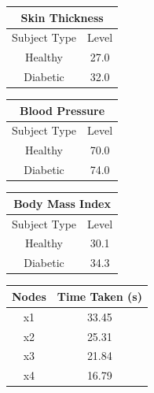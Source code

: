 \documentclass[12pt]{article}
\begin{document}
\begin{table}[]
\centering
\begin{tabular}{|c|c|}
\hline
\multicolumn{2}{|c|}{Skin Thickness} \\ \hline
Subject Type      & Level     \\ \hline
Healthy           & 27.0     \\ \hline
Diabetic          & 32.0     \\ \hline
\end{tabular}
\label{table:10}
\end{table}



\begin{table}[]
\centering
\begin{tabular}{|c|c|}
\hline
\multicolumn{2}{|c|}{Blood Pressure} \\ \hline
Subject Type      & Level     \\ \hline
Healthy           & 70.0    \\ \hline
Diabetic          & 74.0     \\ \hline
\end{tabular}
\label{table:11}
\end{table}


\begin{table}[]
\centering
\begin{tabular}{|c|c|}
\hline
\multicolumn{2}{|c|}{Body Mass Index} \\ \hline
Subject Type      & Level     \\ \hline
Healthy           & 30.1      \\ \hline
Diabetic          & 34.3      \\ \hline
\end{tabular}
\label{table:12}
\end{table}

\begin{table}[]
\centering
\begin{tabular}{|c|c|}
\hline
Nodes & Time Taken (s) \\\hline
x1    & 33.45          \\\hline
x2    & 25.31          \\\hline
x3    & 21.84          \\\hline
x4    & 16.79         \\\hline
\end{tabular}
\label{table:13}
\end{table}
\end{document}
